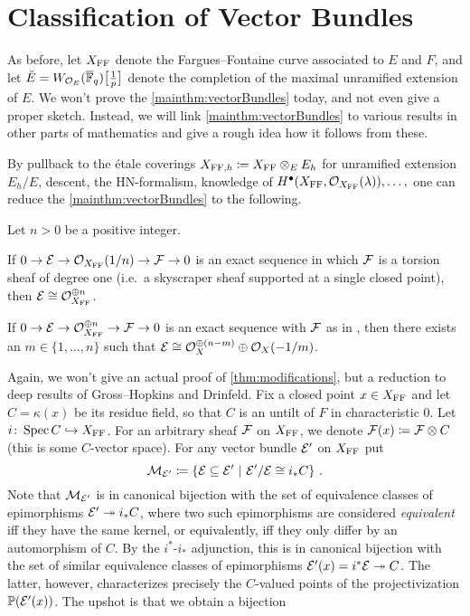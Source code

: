 \documentclass[a4paper, 10pt, oneside, DIV=9, chapterprefix=true, numbers=enddot,bibliography=totoc]{scrbook}
\begin{document}
\section{Classification of Vector Bundles}
As before, let $X_{\mathrm{FF}}$ denote the Fargues--Fontaine curve associated to $E$ and $F$, and let $\breve{E}=W_{\Oo_E}(\ov{\IF}_q)\localize{p}$ denote the completion of the maximal unramified extension of $E$. We won't prove the \cref{mainthm:vectorBundles} today, and not even give a proper sketch. Instead, we will link \cref{mainthm:vectorBundles} to various results in other parts of mathematics and give a rough idea how it follows from these.

By pullback to the étale coverings $X_{\mathrm{FF},h}\coloneqq X_{\mathrm{FF}}\otimes_EE_h$ for unramified extension $E_h/E$, descent, the HN-formalism, knowledge of $H^\bullet(X_{\mathrm{FF}},\mathcal{O}_{X_{\mathrm{FF}}}(\lambda)),\dotsc,$ one can reduce the \cref{mainthm:vectorBundles} to the following.
\begin{thm}\label{thm:modifications}
	Let $n>0$ be a positive integer.
	\begin{numerate}
		\item If $0\morphism \Ee\morphism \Oo_{X_\FFC}(1/n)\morphism \Ff\morphism 0$ is an exact sequence in which $\mathcal{F}$ is a torsion sheaf of degree one (i.e.\ a skyscraper sheaf supported at a single closed point), then $\mathcal{E}\cong \mathcal{O}_{X_{\mathrm{FF}}}^{\oplus n}$.
		\item If $0\morphism \Ee\morphism \Oo_{X_\FFC}^{\oplus n}\morphism \Ff \morphism 0$ is an exact sequence with $\mathcal{F}$ as in , then there exists an $m\in \{1,\dotsc,n\}$ such that $\mathcal{E}\cong \mathcal{O}_X^{\oplus \smash{(n-m)}}\oplus \mathcal{O}_X(-1/m)$.
	\end{numerate}
\end{thm}
\numpar{}\label{par:PEdecomp}Again, we won't give an actual proof of \cref{thm:modifications}, but a reduction to deep results of Gross--Hopkins and Drinfeld. Fix a closed point $x\in X_{\mathrm{FF}}$ and let $C=\kappa(x)$ be its residue field, so that $C$ is an untilt of $F$ in characteristic $0$. Let $i\colon \Spec C\monomorphism X_\FFC$. For an arbitrary sheaf $\mathcal{F}$ on $X_{\mathrm{FF}}$, we denote $\mathcal{F}(x)\coloneqq \mathcal{F}\otimes C$ (this is some $C$-vector space). For any vector bundle $\mathcal{E}'$ on $X_{\mathrm{FF}}$ put
\begin{equation*}
	\mathcal{M}_{\mathcal{E}'}\coloneqq\left\{\mathcal{E}\subseteq \mathcal{E}'\ \middle|\  \mathcal{E}'/\mathcal{E}\cong i_*C\right\}\,.
\end{equation*}
Note that $\mathcal{M}_{\mathcal{E}'}$ is in canonical bijection with the set of equivalence classes of epimorphisms $\Ee'\epimorphism i_*C$, where two such epimorphisms are considered \emph{equivalent} iff they have the same kernel, or equivalently, iff they only differ by an automorphism of $C$. By the $i^*$-$i_*$ adjunction, this is in canonical bijection with the set of similar equivalence classes of epimorphisms $\Ee'(x)=i^*\Ee\epimorphism C$. The latter, however, characterizes precisely the $C$-valued points of the projectivization $\mathbb{P}(\mathcal{E}'(x))$. The upshot is that we obtain a bijection
\end{document}
